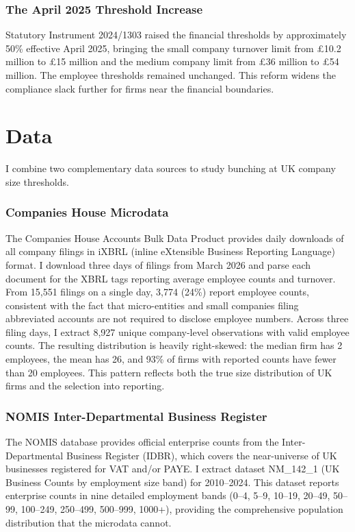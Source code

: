 \documentclass[12pt]{article}
\begin{document}
\subsubsection*{The April 2025 Threshold Increase} Statutory Instrument 2024/1303 raised the financial thresholds by approximately 50\% effective April 2025, bringing the small company turnover limit from \pounds10.2 million to \pounds15 million and the medium company limit from \pounds36 million to \pounds54 million. The employee thresholds remained unchanged. This reform widens the compliance slack further for firms near the financial boundaries.


\section{Data}

I combine two complementary data sources to study bunching at UK company size thresholds.

\subsubsection*{Companies House Microdata} The Companies House Accounts Bulk Data Product provides daily downloads of all company filings in iXBRL (inline eXtensible Business Reporting Language) format. I download three days of filings from March 2026 and parse each document for the XBRL tags reporting average employee counts and turnover. From 15,551 filings on a single day, 3,774 (24\%) report employee counts, consistent with the fact that micro-entities and small companies filing abbreviated accounts are not required to disclose employee numbers. Across three filing days, I extract 8,927 unique company-level observations with valid employee counts. The resulting distribution is heavily right-skewed: the median firm has 2 employees, the mean has 26, and 93\% of firms with reported counts have fewer than 20 employees. This pattern reflects both the true size distribution of UK firms and the selection into reporting.

\subsubsection*{NOMIS Inter-Departmental Business Register} The NOMIS database provides official enterprise counts from the Inter-Departmental Business Register (IDBR), which covers the near-universe of UK businesses registered for VAT and/or PAYE. I extract dataset NM\_142\_1 (UK Business Counts by employment size band) for 2010--2024. This dataset reports enterprise counts in nine detailed employment bands (0--4, 5--9, 10--19, 20--49, 50--99, 100--249, 250--499, 500--999, 1000+), providing the comprehensive population distribution that the microdata cannot.
\end{document}
